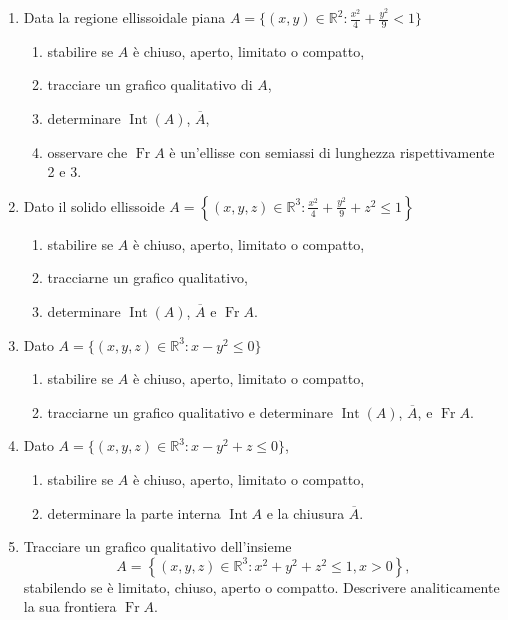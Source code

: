 \begin{enumerate}
	\item Data la regione ellissoidale piana $A = \{(x,y)\in \mathbb{R}^2:\frac{x^2}{4} +\frac{y^2}{9} < 1\}$
	\begin{enumerate}
		\item stabilire se $A$ è chiuso, aperto, limitato o compatto,
		\item tracciare un grafico qualitativo di $A$,
		\item determinare $\operatorname{Int}(A)$, $\overline{A}$,
		\item osservare che $\operatorname{Fr}A$ è un'ellisse con semiassi di lunghezza rispettivamente 2 e 3.
	\end{enumerate}
	
	\item Dato il solido ellissoide $A = \left\{(x,y,z)\in \mathbb{R}^3:\frac{x^2}{4} +\frac{y^2}{9} +z^2\leq 1\right\}$
	\begin{enumerate}
		\item stabilire se $A$ è chiuso, aperto, limitato o compatto,
		\item tracciarne un grafico qualitativo,
		\item determinare $\operatorname{Int}(A)$, $\overline{A}$ e $\operatorname{Fr}A$.
	\end{enumerate}
	
	\item Dato $A = \{(x,y,z)\in \mathbb{R}^3:x - y^2\leq 0\}$
	\begin{enumerate}
		\item stabilire se $A$ è chiuso, aperto, limitato o compatto,
		\item tracciarne un grafico qualitativo e determinare $\operatorname{Int}(A)$, $\overline{A}$, e $\operatorname{Fr}A$.
	\end{enumerate}
	
	\item Dato $A = \{(x,y,z) \in \mathbb{R}^3 : x - y^2 + z \leq 0\}$,
	\begin{enumerate}
		\item stabilire se $A$ è chiuso, aperto, limitato o compatto,
		\item determinare la parte interna $\operatorname{Int} A$ e la chiusura $\overline{A}$.
	\end{enumerate}
	
	\item Tracciare un grafico qualitativo dell'insieme
	\[
	A = \left\{(x, y, z) \in \mathbb{R}^3: x^2 + y^2 + z^2 \leq 1, x > 0\right\},
	\]
	stabilendo se è limitato, chiuso, aperto o compatto. Descrivere analiticamente la sua frontiera $\operatorname{Fr}A$.
	

\end{enumerate}

